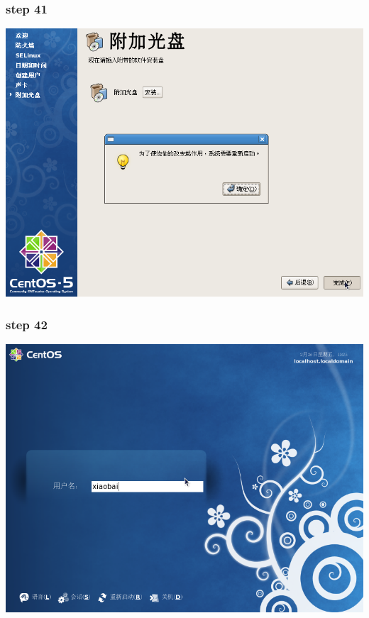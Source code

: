 \documentclass[xcolor=svgnames,presentation]{beamer}
\begin{document}
\begin{frame}
\frametitle{step 41}
\label{sec-2-41}

\begin{center}
\includegraphics[width=.9\linewidth]{img/img64.png}
\end{center}
\end{frame}
\begin{frame}
\frametitle{step 42}
\label{sec-2-42}

\begin{center}
\includegraphics[width=.9\linewidth]{img/img71.png}
\end{center}
\end{frame}
\end{document}
